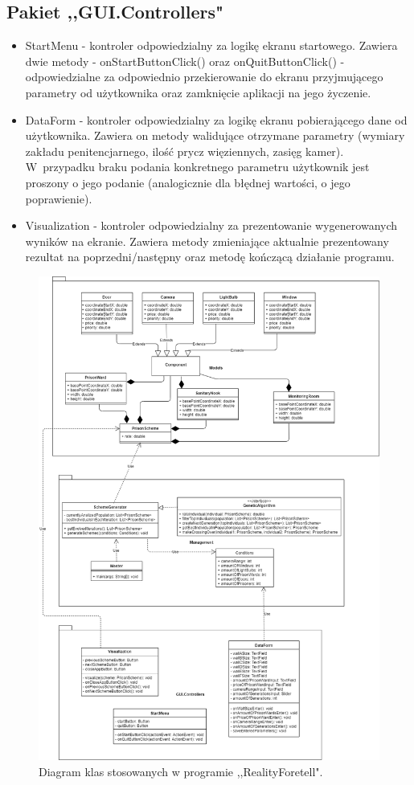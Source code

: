 \documentclass[10pt,oneside]{article}
\begin{document}
	\subsection{Pakiet ,,GUI.Controllers"}
	\begin{itemize}
		\item StartMenu - kontroler odpowiedzialny za logikę ekranu startowego. Zawiera dwie metody - onStartButtonClick() oraz onQuitButtonClick() - odpowiedzialne za odpowiednio przekierowanie do ekranu przyjmującego parametry od użytkownika oraz zamknięcie aplikacji na jego życzenie.
		\item DataForm - kontroler odpowiedzialny za logikę ekranu pobierającego dane od użytkownika. Zawiera on metody walidujące otrzymane parametry (wymiary zakładu penitencjarnego, ilość prycz więziennych, zasięg kamer). W~przypadku braku podania konkretnego parametru użytkownik jest proszony o jego podanie (analogicznie dla błędnej wartości, o jego poprawienie).
		\item Visualization - kontroler odpowiedzialny za prezentowanie wygenerowanych wyników na ekranie. Zawiera metody zmieniające aktualnie prezentowany rezultat na poprzedni/następny oraz metodę kończącą działanie programu.
	\end{itemize}
	\begin{figure}[!ht]
		\includegraphics[width=0.9\columnwidth]{Class_diagram_Reality_Foretell.png}
		\caption{Diagram klas stosowanych w programie ,,RealityForetell".}
	\end{figure}
	
\end{document}
